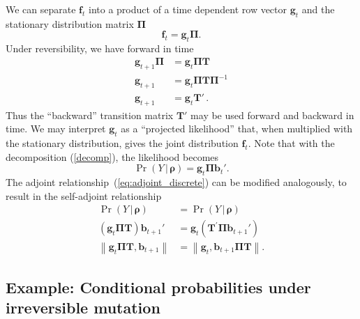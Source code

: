 \documentclass[preprint]{elsarticle}
\newcommand{\bs}[1]{\ensuremath{\boldsymbol{#1}}}
\newcommand\given{{\,|\,}}
\newcommand{\norm}[1]{\left\lVert#1\right\rVert}
\newcommand\x[1]{\ensuremath{X_{#1}}}
\newcommand\y{\ensuremath{Y}}
\newcommand\fv[1]{\ensuremath{\mathbf{f}_{#1}}}
\newcommand\bv[1]{\ensuremath{\mathbf{b}_{#1}}}
\newcommand\gv[1]{\ensuremath{\mathbf{g}_{#1}}}
\begin{document}
We can separate $\fv{t}$ into a product of a time dependent row vector $\gv{t}$ and the stationary distribution matrix $\mathbf{\Pi}$
\begin{equation}\label{decomp}
\fv{t}=\gv{t}\mathbf{\Pi}.
\end{equation}
Under reversibility, we have forward in time
\begin{equation}
\begin{split}
\gv{t+1}\mathbf{\Pi} &=\gv{t}\mathbf{\Pi}\mathbf{T}\\
\gv{t+1}             &=\gv{t}\mathbf{\Pi}\mathbf{T}\mathbf{\Pi}^{-1}\\
\gv{t+1}             &=\gv{t}\mathbf{T}'\,.
\end{split}
\end{equation}
Thus the ``backward'' transition matrix $\mathbf{T}'$ may be used forward and backward in time. We may interpret $\gv{t}$
as a ``projected likelihood'' that, when multiplied with the stationary distribution, gives the joint distribution $\fv{t}$. Note that with the decomposition (\ref{decomp}), the likelihood becomes
\begin{equation}
\Pr(\y \given \bs{\rho}) = \gv{t} \mathbf{\Pi} \bv{t}'.
\end{equation}
The adjoint relationship~(\ref{eq:adjoint_discrete}) can be modified analogously, to result in the self-adjoint relationship
\begin{equation}\label{eq:adjoint_discrete_2}
\begin{split}
\Pr(\y \given \bs{\rho})                              & = \Pr(\y \given \bs{\rho})                    \\
(\gv{t}\mathbf{\Pi} \mathbf{T}) \bv{t+1}'             & = \gv{t}(\mathbf{T}^{'}\mathbf{\Pi}\bv{t+1}') \\
\norm{ \gv{t}\mathbf{\Pi}\mathbf{T},\bv{t+1}}         & = 
\norm{ \gv{t},\bv{t+1}\mathbf{\Pi}\mathbf{T} }.
\end{split}
\end{equation}

\subsection{Example: Conditional probabilities under irreversible mutation}\label{section:irreversible}
\end{document}
